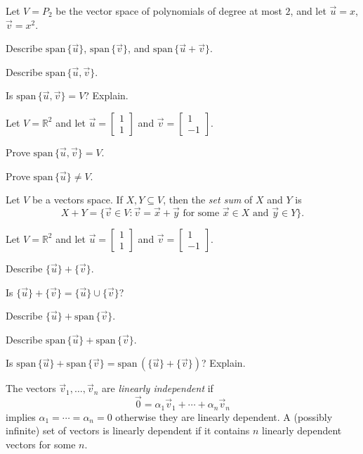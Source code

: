 \documentclass[14pt]{problemset}
\newcommand{\R}{\mathbb{R}}
\newcommand{\Span}{\mathrm{span}\,}
\newcommand{\mat}[1]{\begin{bmatrix}#1\end{bmatrix}}
\begin{document}
	\question
		Let $V=P_2$ be the vector space of polynomials of degree at most $2$, and let $\vec u=x$, $\vec v=x^2$.
	\begin{parts}
		\item Describe $\Span\{\vec u\}$, $\Span\{\vec v\}$, and $\Span\{\vec u+\vec v\}$.
		\item Describe $\Span\{\vec u,\vec v\}$.
		\item Is $\Span\{\vec u,\vec v\}=V$? Explain.
	\end{parts}

	\question
	Let $V=\R^2$ and let $\vec u=\mat{1\\1}$ and $\vec v=\mat{1\\-1}$.
	\begin{parts}
		\item Prove $\Span\{\vec u,\vec v\}=V$.
		\item Prove $\Span\{\vec u\}\neq V$.
	\end{parts}

	\begin{definition}
		Let $V$ be a vectors space. If $X,Y\subseteq V$, then the \emph{set sum}
		of $X$ and $Y$ is
		\[
			X+Y = \{\vec v\in V:\vec v=\vec x+\vec y\text{ for some }\vec x\in X\text{ and }\vec y \in Y\}.
		\]
	\end{definition}

	\question
		Let $V=\R^2$ and let $\vec u=\mat{1\\1}$ and $\vec v=\mat{1\\-1}$.
		\begin{parts}
		\item Describe $\{\vec u\}+\{\vec v\}$.
		\item Is $\{\vec u\}+\{\vec v\}=\{\vec u\}\cup\{\vec v\}$?
		\item Describe $\{\vec u\}+\Span\{\vec v\}$.
		\item Describe $\Span\{\vec u\}+\Span\{\vec v\}$.
		\item Is $\Span\{\vec u\}+\Span\{\vec v\} = \Span(\{\vec u\}+\{\vec v\})$? Explain.
		\end{parts}

	\begin{definition}
		The vectors $\vec v_1,\ldots, \vec v_n$ are \emph{linearly independent} if
		\[
			\vec 0=\alpha_1\vec v_1+\cdots+\alpha_n\vec v_n
		\]
		implies $\alpha_1=\cdots=\alpha_n=0$ otherwise they are linearly
		dependent. A (possibly infinite) set of vectors is linearly dependent if it contains 
		$n$ linearly dependent vectors for some $n$.
	\end{definition}
\end{document}
